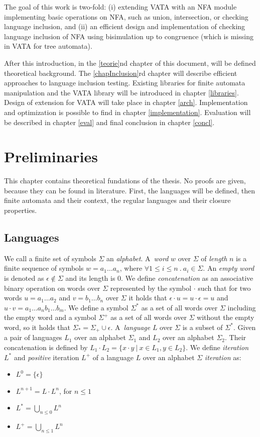 The goal of this work is two-fold: (i) extending VATA with an NFA module implementing basic operations on NFA, such as union, intersection, or 
checking language inclusion, and (ii) an efficient design and implementation of checking language inclusion of NFA using 
bisimulation up to congruence (which is missing in VATA for tree automata).

After this introduction, in the \ref{teorie}nd chapter of this document, 
will be defined theoretical background. The \ref{chapInclusion}rd chapter will describe efficient approaches to language inclusion testing.
Existing libraries for finite automata manipulation and the VATA library will be introduced in chapter \ref{libraries}. 
Design of extension for VATA 
will take place in chapter \ref{arch}. Implementation and optimization is possible to find in chapter \ref{implementation}. Evaluation will be
described in chapter \ref{eval} and final conclusion in chapter \ref{concl}.


\chapter{Preliminaries}
This chapter contains theoretical fundations of the thesis. No proofs are given, because they can be found in literature. 
First, the languages will be defined, then finite automata and their context, the regular languages and their closure properties. 
\label{teorie}

\section{Languages}
We call a finite set of symbols $\Sigma$ an \emph{alphabet}. A~\emph{word} $w$ over $\Sigma$ of \emph{length} $n$ is a finite sequence of symbols 
$w=a_1\ldots a_n$, where $\forall 1 \leq i \leq n\ . \ a_i \in \Sigma$. An \emph{empty word} is denoted as $\epsilon \not\in\Sigma$ and its length is $0$. 
We define \emph{concatenation} as an associative binary operation on words over $\Sigma$ represented by the symbol $\cdot$ such that for two words $u=a_1\ldots a_2$
and $v=b_1\ldots b_n$ over $\Sigma$ it holds that $\epsilon\cdot u=u\cdot\epsilon=u$ and $u\cdot v=a_1 \ldots a_nb_1 \ldots b_m$.
We define a symbol $\Sigma^{*}$ as a set of all words over $\Sigma$ including the empty word and a symbol $\Sigma^{+}$ as a set of 
all words over $\Sigma$ without the empty word, 
so it holds that $\Sigma_{*}=\Sigma_{+}\cup\epsilon$. A~\emph{language} $L$ over $\Sigma$ is a subset of $\Sigma^{*}$.
Given a pair of languages $L_1$ over an alphabet $\Sigma_{1}$ and $L_{2}$ over an alphabet $\Sigma_{2}$. Their concatenation is defined by 
$L_1\cdot L_2=\{x\cdot y\ |\ x\in L_1, y\in L_2 \}$.
We define \emph{iteration} $L^{*}$ and \emph{positive} iteration $L^{+}$ of a language $L$ over an alphabet $\Sigma$ \emph{iteration} as:
	\begin{itemize}
		\item $L^0=\{\epsilon\}$
		\item $L^{n+1}=L\cdot L^n$, for $n \leq 1$
    \item $L^{*}=\bigcup_{n\leq 0} L^{n}$
    \item $L^{+}=\bigcup_{n\leq 1} L^{n}$
	\end{itemize}

